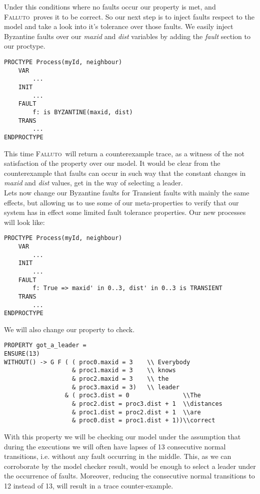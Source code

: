 \documentclass[12pt]{llncs2e/llncs}
\newcommand{\fallutoSp}{\mbox{\textsc{Falluto~}}}
\begin{document}
Under this conditions where no faults occur our property is met, and \fallutoSp proves it to be correct. So our next step is to inject faults respect to the model and take a look into it's tolerance over those faults. We easily inject Byzantine faults over our \textit{maxid} and \textit{dist} variables by adding the \textit{fault} section to our proctype.
\begin{framed}
\begin{verbatim}
PROCTYPE Process(myId, neighbour)
    VAR
        ...
    INIT
        ...
    FAULT
        f: is BYZANTINE(maxid, dist)
    TRANS
        ...
ENDPROCTYPE
\end{verbatim}
\end{framed}
This time \fallutoSp will return a counterexample trace, as a witness of the not satisfaction of the property over our model. It would be clear from the counterexample that faults can occur in such way that the constant changes in \textit{maxid} and \textit{dist} values, get in the way of selecting a leader.\\
Lets now change our Byzantine faults for Transient faults with mainly the same effects, but allowing us to use some of our meta-properties to verify that our system has in effect some limited fault tolerance properties. Our new processes will look like:
\begin{framed}
 \begin{verbatim}
PROCTYPE Process(myId, neighbour)
    VAR
        ...
    INIT
        ...
    FAULT
        f: True => maxid' in 0..3, dist' in 0..3 is TRANSIENT
    TRANS
        ...
ENDPROCTYPE
\end{verbatim}
\end{framed}
We will also change our property to check.
\begin{framed}
\begin{verbatim}
PROPERTY got_a_leader =
ENSURE(13)
WITHOUT() -> G F ( ( proc0.maxid = 3    \\ Everybody
                   & proc1.maxid = 3    \\ knows
                   & proc2.maxid = 3    \\ the
                   & proc3.maxid = 3)   \\ leader
                 & ( proc3.dist = 0               \\The
                   & proc2.dist = proc3.dist + 1  \\distances
                   & proc1.dist = proc2.dist + 1  \\are
                   & proc0.dist = proc1.dist + 1))\\correct
\end{verbatim}
\end{framed}
With this property we will be checking our model under the assumption that during the executions we will often have lapses of 13 consecutive normal transitions, i.e. without any fault occurring in the middle. This, as we can corroborate by the model checker result, would be enough to select a leader under the occurrence of faults. Moreover, reducing the consecutive normal transitions to 12 instead of 13, will result in a trace counter-example.
\end{document}
